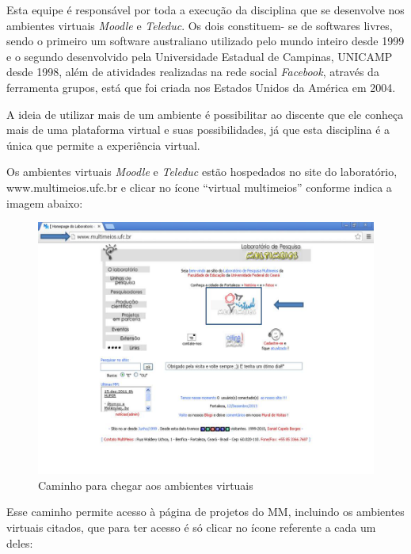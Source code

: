 Esta equipe é responsável por toda a execução da disciplina que se desenvolve nos ambientes virtuais \textit{Moodle} e \textit{Teleduc}. Os dois constituem- se de softwares livres, sendo o primeiro um software australiano utilizado pelo mundo inteiro desde 1999 e o segundo desenvolvido pela Universidade Estadual de Campinas, UNICAMP desde 1998, além de atividades realizadas na rede social \textit{Facebook}, através da ferramenta grupos, está que foi criada nos Estados Unidos da América em 2004.

A ideia de utilizar mais de um ambiente é possibilitar ao discente que ele conheça mais de uma plataforma virtual e suas possibilidades, já que esta disciplina é a única que permite a experiência virtual.

Os ambientes virtuais \textit{Moodle} e \textit{Teleduc} estão hospedados no site do laboratório, www.multimeios.ufc.br e clicar no ícone ``virtual multimeios'' conforme indica a imagem abaixo:

\begin{figure}[!ht]
    \centering
    \includegraphics[scale=.5]{f1.png}
    \caption{Caminho para chegar aos ambientes virtuais}
    \label{fig:caminho}
\end{figure}

Esse caminho permite acesso à página de projetos do MM, incluindo os ambientes virtuais citados, que para ter acesso é só clicar no ícone referente a cada um deles:

